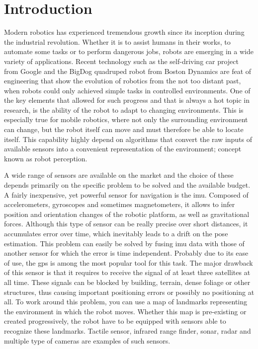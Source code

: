 \chapter*{Introduction} 

Modern robotics has experienced tremendous growth since its inception during the industrial revolution. Whether it is to assist humans in their works, to automate some tasks or to perform dangerous jobs, robots are emerging in a wide variety of applications. Recent technology such as the self-driving car project from Google and the BigDog quadruped robot from Boston Dynamics are feat of engineering that show the evolution of robotics from the not too distant past, when robots could only achieved simple tasks in controlled environments. One of the key elements that allowed for such progress and that is always a hot topic in research, is the ability of the robot to adapt to changing environments. This is especially true for mobile robotics, where not only the surrounding environment can change, but the robot itself can move and must therefore be able to locate itself. This capability highly depend on algorithms that convert the raw inputs of available sensors into a convenient representation of the environment; concept known as robot perception.

A wide range of sensors are available on the market and the choice of these depends primarily on the specific problem to be solved and the available budget. A fairly inexpensive, yet powerful sensor for navigation is the \gls*{imu}. Composed of accelerometers, gyroscopes and sometimes magnetometers, it allows to infer position and orientation changes of the robotic platform, as well as gravitational forces. Although this type of sensor can be really precise over short distances, it accumulates error over time, which inevitably leads to a drift on the pose estimation. This problem can easily be solved by fusing \gls*{imu} data with those of another sensor for which the error is time independent. Probably due to its ease of use, the \gls*{gps} is among the most popular tool for this task. The major drawback of this sensor is that it requires to receive the signal of at least three satellites at all time. These signals can be blocked by building, terrain, dense foliage or other structures, thus causing important positioning errors or possibly no positioning at all. To work around this problem, you can use a map of landmarks representing the environment in which the robot moves. Whether this map is pre-existing or created progressively, the robot have to be equipped with sensors able to recognize these landmarks. Tactile sensor, infrared range finder, \gls*{sonar}, \gls*{radar} and multiple type of cameras are examples of such sensors.

